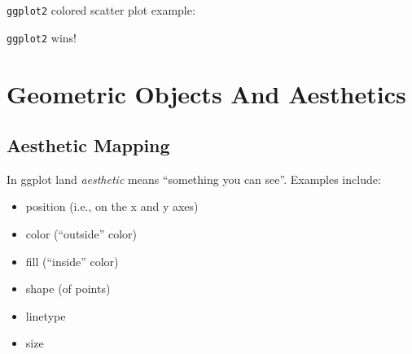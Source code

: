 \documentclass[]{book}
\newenvironment{Shaded}{\begin{snugshade}}{\end{snugshade}}
\newcommand{\KeywordTok}[1]{\textcolor[rgb]{0.13,0.29,0.53}{\textbf{#1}}}
\newcommand{\DataTypeTok}[1]{\textcolor[rgb]{0.13,0.29,0.53}{#1}}
\newcommand{\DecValTok}[1]{\textcolor[rgb]{0.00,0.00,0.81}{#1}}
\newcommand{\StringTok}[1]{\textcolor[rgb]{0.31,0.60,0.02}{#1}}
\newcommand{\OperatorTok}[1]{\textcolor[rgb]{0.81,0.36,0.00}{\textbf{#1}}}
\newcommand{\NormalTok}[1]{#1}
\providecommand{\tightlist}{%
  \setlength{\itemsep}{0pt}\setlength{\parskip}{0pt}}
\begin{document}
\begin{Shaded}
\end{Shaded}

\texttt{ggplot2} colored scatter plot example:

\begin{Shaded}
\end{Shaded}

\texttt{ggplot2} wins!

\section{Geometric Objects And
Aesthetics}\label{geometric-objects-and-aesthetics}

\subsection{Aesthetic Mapping}\label{aesthetic-mapping}

In ggplot land \emph{aesthetic} means ``something you can see''.
Examples include:

\begin{itemize}
\tightlist
\item
  position (i.e., on the x and y axes)
\item
  color (``outside'' color)
\item
  fill (``inside'' color)
\item
  shape (of points)
\item
  linetype
\item
  size
\end{itemize}
\end{document}

